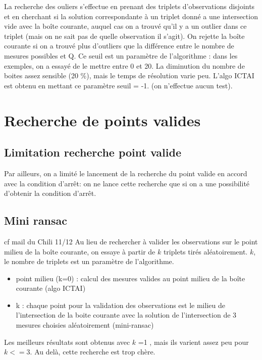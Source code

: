 \documentclass{article}
\begin{document}
   La recherche des ouliers s'effectue en prenant des triplets d'observations disjoints et en cherchant si la solution correspondante \`a un triplet donn\'e a une intersection  vide avec la bo\^ite courante, auquel cas on a trouv\'e qu'il y a un outlier dans ce triplet (mais on ne
sait pas de quelle observation il s'agit).
   On rejette la bo\^ite courante si on a trouv\'e plus d'outliers que la diff\'erence entre le nombre de mesures possibles et  Q. 
   Ce seuil est un  param\`etre de l'algorithme : dans les exemples, on a essay\'e de le mettre entre 0 et 20.
   La  diminution du nombre de boites assez sensible (20 \%), mais le temps de r\'esolution varie peu.
   L'algo ICTAI est obtenu en mettant ce param\`etre seuil = -1. (on n'effectue aucun test).

\section{Recherche de points valides}
\label{ptvalide}
\subsection{Limitation recherche point valide}
Par ailleurs, on a limit\'e le lancement de la recherche du point valide en accord avec la condition d'arr\^et:
 on ne lance cette recherche que si on a une possibilit\'e d'obtenir la condition d'arr\^et.
   

\subsection{Mini ransac}
  cf mail du Chili  11/12
    Au lieu de rechercher \`a valider les observations sur le point milieu de la bo\^ite courante, on essaye \`a partir de $k$ triplets
tir\'es al\'eatoirement. $k$, le nombre de triplets  est un param\`etre de l'algorithme.

\begin {itemize}
\item point milieu (k=0)  : calcul des mesures valides au point milieu de la bo\^ite courante  (algo ICTAI)
\item k :  chaque point pour la validation des observations est le milieu de l'intersection  de la boite courante avec la solution
	  de l'intersection de 3 mesures choisies al\'eatoirement (mini-ransac)
\end{itemize}     
Les meilleurs r\'esultats sont obtenus avec $k$ =1 , mais ils varient assez peu pour $k <= 3$.  Au del\`a, cette recherche est trop
ch\`ere.
\end{document}
